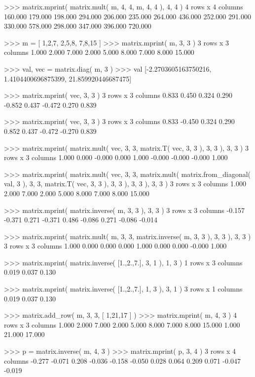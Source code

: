 \begin{pyglist}[language=python,fvset={frame=single}]
>>> matrix.mprint( matrix.mult( m, 4, 4, m, 4, 4 ), 4, 4 )
4 rows x 4 columns
 160.000  179.000  198.000  294.000 
 206.000  235.000  264.000  436.000 
 252.000  291.000  330.000  578.000 
 298.000  347.000  396.000  720.000 

>>> m = [ 1,2,7, 2,5,8, 7,8,15 ]
>>> matrix.mprint( m, 3, 3 )
3 rows x 3 columns
   1.000    2.000    7.000 
   2.000    5.000    8.000 
   7.000    8.000   15.000 

>>> val, vec = matrix.diag( m, 3 )
>>> val
[-2.2703605163750216, 1.4104400696875399, 21.859920446687475]

>>> matrix.mprint( vec, 3, 3 )
3 rows x 3 columns
   0.833    0.450    0.324 
   0.290   -0.852    0.437 
  -0.472    0.270    0.839 

>>> matrix.mprint( vec, 3, 3 )
3 rows x 3 columns
   0.833   -0.450    0.324 
   0.290    0.852    0.437 
  -0.472   -0.270    0.839 

>>> matrix.mprint( matrix.mult( vec, 3, 3, matrix.T( vec, 3, 3 ), 3, 3 ), 3, 3 )
3 rows x 3 columns
   1.000    0.000   -0.000 
   0.000    1.000   -0.000 
  -0.000   -0.000    1.000 

>>> matrix.mprint( matrix.mult( vec, 3, 3, matrix.mult(
    matrix.from_diagonal( val, 3 ), 3, 3, matrix.T( vec, 3, 3 ), 3, 3 ), 3, 3 ), 3, 3 )
3 rows x 3 columns
   1.000    2.000    7.000 
   2.000    5.000    8.000 
   7.000    8.000   15.000 

>>> matrix.mprint( matrix.inverse( m, 3, 3 ), 3, 3 )
3 rows x 3 columns
  -0.157   -0.371    0.271 
  -0.371    0.486   -0.086 
   0.271   -0.086   -0.014 

>>> matrix.mprint( matrix.mult( m, 3, 3, matrix.inverse( m, 3, 3 ), 3, 3 ), 3, 3 )
3 rows x 3 columns
   1.000    0.000    0.000 
   0.000    1.000    0.000 
   0.000   -0.000    1.000 

>>> matrix.mprint( matrix.inverse( [1.,2.,7.], 3, 1 ), 1, 3 )
1 rows x 3 columns
   0.019    0.037    0.130 

>>> matrix.mprint( matrix.inverse( [1.,2.,7.], 1, 3 ), 3, 1 )
3 rows x 1 columns
   0.019 
   0.037 
   0.130 

>>> matrix.add_row( m, 3, 3, [ 1,21,17 ] )
>>> matrix.mprint( m, 4, 3 )
4 rows x 3 columns
   1.000    2.000    7.000 
   2.000    5.000    8.000 
   7.000    8.000   15.000 
   1.000   21.000   17.000 

>>> p = matrix.inverse( m, 4, 3 )
>>> matrix.mprint( p, 3, 4 )
3 rows x 4 columns
  -0.277   -0.071    0.208   -0.036 
  -0.158   -0.050    0.028    0.064 
   0.209    0.071   -0.047   -0.019 


\end{pyglist}
